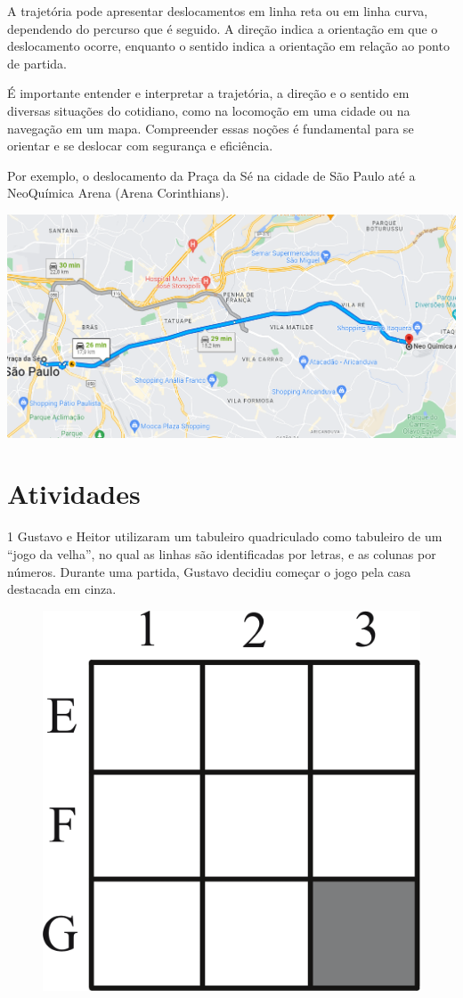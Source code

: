 {A trajetória pode apresentar deslocamentos em linha reta ou em linha
curva, dependendo do percurso que é seguido. A direção indica a
orientação em que o deslocamento ocorre, enquanto o sentido indica a
orientação em relação ao ponto de partida.

É importante entender e interpretar a trajetória, a direção e o sentido
em diversas situações do cotidiano, como na locomoção em uma cidade ou
na navegação em um mapa. Compreender essas noções é fundamental para se
orientar e se deslocar com segurança e eficiência.

Por exemplo, o deslocamento da Praça da Sé na cidade de São Paulo até a
NeoQuímica Arena (Arena Corinthians).

\includegraphics[width=\textwidth]{./_SAEB_9_MAT/media/image196.png}


}

\section{Atividades}

\num{1} Gustavo e Heitor utilizaram um tabuleiro quadriculado como tabuleiro
de um ``jogo da velha'', no qual as linhas são identificadas por letras,
e as colunas por números. Durante uma partida, Gustavo decidiu começar
o jogo pela casa destacada em cinza.

\begin{figure}[htpb!]
\centering
\includegraphics[width=.25\textwidth]{./ilustras-mat/modulo_12-atividade_1.png}
\end{figure}

